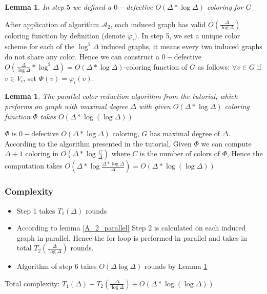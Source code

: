 \documentclass[11pt]{article}
\newtheorem{lemma}[theorem]{Lemma}
\begin{document}
\begin{lemma}
In step $5$ we defined a $0-$defective $O(\Delta*\log{\Delta})$ coloring for $G$
\end{lemma}
After application of algorithm $\mathcal{A}_2$, each induced graph has valid $O(\frac{\Delta}{\log{\Delta}})$ coloring function by definition (denote $\varphi_i)$. In step 5, we set a unique color scheme for each of the $\log^2{\Delta}$ induced graphs, it means every two induced graphs do not share any color. Hence we can construct a  $0-$defective $O(\frac{\Delta}{\log{\Delta}} * \log^2{\Delta})
=O(\Delta * \log{\Delta})$-coloring function of $G$ as follows: $\forall v \in G$ if $v \in V_i$, set $\Phi(v) = \varphi_i(v)$. 
\begin{lemma}
\label{parallel_reduction_tutorial}
The parallel color reduction algorithm from the tutorial, which preforms on graph with maximal degree $\Delta$ with given $O(\Delta * \log{\Delta})$ coloring function $\Phi$ takes $O(\Delta * \log({\log{\Delta}}))$
\end{lemma}
$\Phi$ is $0-$defective $O(\Delta*\log{\Delta})$ coloring, $G$ has maximal degree of $\Delta$. According to the algorithm presented in the tutorial, Given $\Phi$ we can compute $\Delta+1$ coloring in 
$O(\Delta * \log{\frac{C}{\Delta}})$ where $C$ is the number of colors of $\Phi$, Hence the computation takes $O(\Delta * \log{\frac{\Delta*\log{\Delta}}{\Delta}})=O(\Delta * \log({\log{\Delta}}))
$


\subsubsection*{Complexity}
\begin{itemize}
    \item Step 1 takes $T_1(\Delta)$ rounds
    \item According to lemma \ref{A_2_parallel} Step 2 is calculated on each induced graph in parallel. Hence the for loop is preformed in parallel and takes in total $T_2(\frac{\Delta}{\log{\Delta}})$ rounds. 
    \item Algorithm of step 6 takes $O(\Delta\log{\Delta})$ rounds by Lemma \ref{parallel_reduction_tutorial}
\end{itemize}

Total complexity: $T_1(\Delta) + T_2(\frac{\Delta}{\log{\Delta}}) + O(\Delta * \log({\log{\Delta}}))$ 
\end{document}
